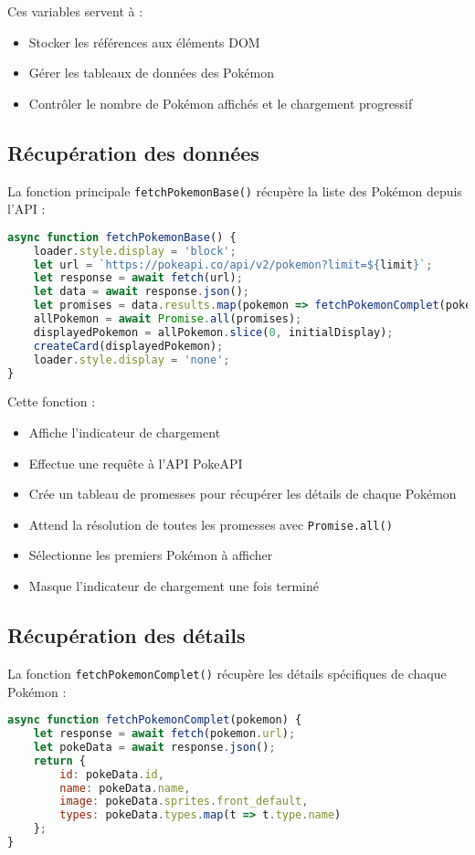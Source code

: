 \documentclass{article}
\begin{document}
Ces variables servent à :
\begin{itemize}
    \item Stocker les références aux éléments DOM
    \item Gérer les tableaux de données des Pokémon
    \item Contrôler le nombre de Pokémon affichés et le chargement progressif
\end{itemize}

\subsection{Récupération des données}
La fonction principale \texttt{fetchPokemonBase()} récupère la liste des Pokémon depuis l'API :

\begin{lstlisting}[language=JavaScript]
async function fetchPokemonBase() {
    loader.style.display = 'block';
    let url = `https://pokeapi.co/api/v2/pokemon?limit=${limit}`;
    let response = await fetch(url);
    let data = await response.json();
    let promises = data.results.map(pokemon => fetchPokemonComplet(pokemon));
    allPokemon = await Promise.all(promises);
    displayedPokemon = allPokemon.slice(0, initialDisplay);
    createCard(displayedPokemon);
    loader.style.display = 'none';
}
\end{lstlisting}

Cette fonction :
\begin{itemize}
    \item Affiche l'indicateur de chargement
    \item Effectue une requête à l'API PokeAPI
    \item Crée un tableau de promesses pour récupérer les détails de chaque Pokémon
    \item Attend la résolution de toutes les promesses avec \texttt{Promise.all()}
    \item Sélectionne les premiers Pokémon à afficher
    \item Masque l'indicateur de chargement une fois terminé
\end{itemize}

\subsection{Récupération des détails}
La fonction \texttt{fetchPokemonComplet()} récupère les détails spécifiques de chaque Pokémon :

\begin{lstlisting}[language=JavaScript]
async function fetchPokemonComplet(pokemon) {
    let response = await fetch(pokemon.url);
    let pokeData = await response.json();
    return {
        id: pokeData.id,
        name: pokeData.name,
        image: pokeData.sprites.front_default,
        types: pokeData.types.map(t => t.type.name)
    };
}
\end{lstlisting}
\end{document}
